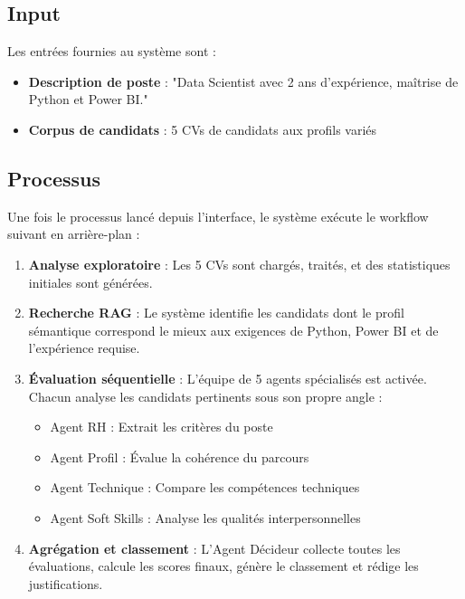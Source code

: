 \documentclass{rapportECL}
\begin{document}
\subsection{Input}

Les entrées fournies au système sont :

\begin{itemize}[leftmargin=*]
    \item \textbf{Description de poste} : "Data Scientist avec 2 ans d'expérience, maîtrise de Python et Power BI."
    \item \textbf{Corpus de candidats} : 5 CVs de candidats aux profils variés
\end{itemize}

\subsection{Processus}

Une fois le processus lancé depuis l'interface, le système exécute le workflow suivant en arrière-plan :

\begin{enumerate}[leftmargin=*]
    \item \textbf{Analyse exploratoire} : Les 5 CVs sont chargés, traités, et des statistiques initiales sont générées.
    
    \item \textbf{Recherche RAG} : Le système identifie les candidats dont le profil sémantique correspond le mieux aux exigences de Python, Power BI et de l'expérience requise.
    
    \item \textbf{Évaluation séquentielle} : L'équipe de 5 agents spécialisés est activée. Chacun analyse les candidats pertinents sous son propre angle :
    \begin{itemize}
        \item Agent RH : Extrait les critères du poste
        \item Agent Profil : Évalue la cohérence du parcours
        \item Agent Technique : Compare les compétences techniques
        \item Agent Soft Skills : Analyse les qualités interpersonnelles
    \end{itemize}
    
    \item \textbf{Agrégation et classement} : L'Agent Décideur collecte toutes les évaluations, calcule les scores finaux, génère le classement et rédige les justifications.
\end{enumerate}
\end{document}
